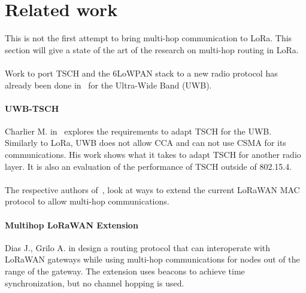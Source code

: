 

\section{Related work}

This is not the first attempt to bring multi-hop communication to LoRa.
This section will give a state of the art of the research on
multi-hop routing in LoRa.

\paragraph{}

Work to port TSCH and the 6LoWPAN stack to a new radio protocol has already 
been done in~\cite{uwbtsch} for the Ultra-Wide Band (UWB).


\paragraph{UWB-TSCH}

Charlier M. in~\cite{uwbtsch} explores the requirements to adapt TSCH for the UWB.
Similarly to LoRa, UWB does not allow CCA and can not use CSMA for its 
communications.
His work shows what it takes to adapt TSCH for another radio layer. 
It is also an evaluation of the performance of TSCH outside of 802.15.4.

\paragraph{}

The respective authors of~\cite{DIAS2018424, 8856256}, look at ways to extend
the current LoRaWAN MAC protocol to allow multi-hop communications.

\paragraph{Multihop LoRaWAN Extension} Dias J., Grilo A. in \cite{DIAS2018424}
design a routing protocol that can interoperate with LoRaWAN gateways while
using multi-hop communications for nodes out of the range of the gateway.  
The extension uses beacons to achieve time synchronization, but no channel
hopping is used.

